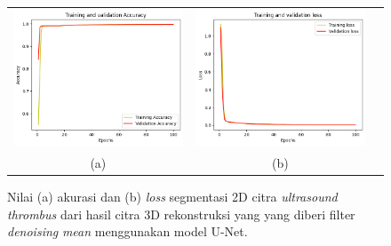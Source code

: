 \begin{enumerate}
	
	\begin{figure}[htbp]
		\centering
		\begin{tabular}{ccc}
			\includegraphics[scale=0.4]{bab4/Rekap Training/UNet/Mean/3/acc_99,71330165863037.png} &
			\includegraphics[scale=0.4]{bab4/Rekap Training/UNet/Mean/3/loss_0,0069.png} & \\
			(a) & (b)    %
		\end{tabular}
		\caption{Nilai (a) akurasi dan (b) \textit{loss} segmentasi 2D citra \textit{ultrasound} \textit{thrombus} dari hasil citra 3D rekonstruksi yang yang diberi filter \textit{denoising} \textit{mean} menggunakan model U-Net.}
		\label{fig:performance-mean-unet-rekonstruksi}
	\end{figure}
	

\end{enumerate}
